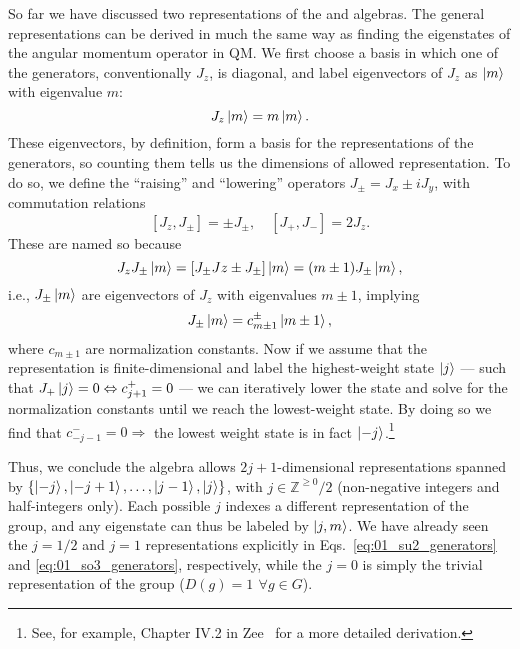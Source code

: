 So far we have discussed two representations of the \so[3] and \su[2] algebras.
The general representations can be derived in much the same way as finding the eigenstates of the angular momentum operator in QM.
We first choose a basis in which one of the generators, conventionally $J_z$, is diagonal, and label eigenvectors of $J_z$ as $\ket{m}$ with eigenvalue $m$:
\begin{equation}
	\label{eq:01_so3_su2_eigenstates}
	J_z\ket{m} = m\ket{m}.
\end{equation}
These eigenvectors, by definition, form a basis for the representations of the generators, so counting them tells us the dimensions of allowed representation.
To do so, we define the ``raising'' and ``lowering'' operators $J_{\pm} = J_x \pm i J_y$, with commutation relations
\begin{equation}
	\label{eq:01_so3_su2_raise_lower}
	[J_z, J_{\pm}] = \pm J_{\pm}, \quad [J_+, J_-] = 2J_z.
\end{equation}
These are named so because
\begin{equation}
	\label{eq:01_so3_su2_raise_lower_eigenstates}
	J_zJ_\pm\ket{m} = [J_\pm Jz \pm J_\pm]\ket{m} = (m \pm 1)J_\pm\ket{m},
\end{equation}										
i.e., $J_\pm\ket{m}$ are eigenvectors of $J_z$ with eigenvalues $m \pm 1$, implying
\begin{equation}
	\label{eq:01_so3_su2_raise_lower_operation}
	J_\pm\ket{m} = c^\pm_{m\pm1}\ket{m \pm 1},
\end{equation}
where $c_{m\pm1}$ are normalization constants.
Now if we assume that the representation is finite-dimensional and label the highest-weight state $\ket{j}$ --- such that $J_+\ket{j} = 0 \Leftrightarrow c^+_{j+1} = 0$ --- we can iteratively lower the state and solve for the normalization constants until we reach the lowest-weight state.
By doing so we find that $c^-_{-j-1} = 0 \Rightarrow$ the lowest weight state is in fact $\ket{-j}$.\footnote{See, for example, Chapter IV.2 in Zee~\cite{Zee:2016fuk} for a more detailed derivation.}

Thus, we conclude the algebra allows $2j+1$-dimensional representations spanned by $\{\ket{-j}, \ket{-j+1}, \ldots, \ket{j-1}, \ket{j}\}$, with $j \in \mathbb Z^{\geq0}/2$ (non-negative integers and half-integers only).
Each possible $j$ indexes a different representation of the group, and any eigenstate can thus be labeled by $\ket{j, m}$.
We have already seen the $j = 1/2$ and $j = 1$ representations explicitly in Eqs.~\ref{eq:01_su2_generators} and \ref{eq:01_so3_generators}, respectively, while the $j = 0$ is simply the trivial representation of the group ($D(g) = 1 \,\ \forall g \in G$).

